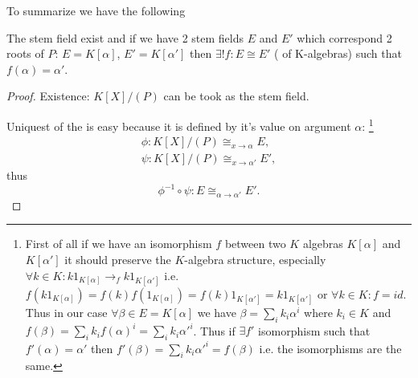 To summarize we have the following
\begin{proposition}
  The stem field exist and if we have 2 stem fields $E$ and $E'$ which
  correspond 2 roots of $P$: $E = K\left[\alpha\right]$,
  $E' = K\left[\alpha'\right]$ then $\exists! f: E \cong E'$
  ( of K-algebras) such that $f(\alpha) =
  \alpha'$. 
  \begin{proof}
    Existence: $K\left[X\right]/\left(P\right)$ can be took as the
    stem field.

    Uniquest of the  is easy because it is
    defined by it's value on argument $\alpha$:
    \footnote{
      \label{note:stemfieldisomorphismunique}
      First of all if we have an isomorphism $f$ between two $K$ algebras
      $K\left[\alpha \right]$ and $K\left[\alpha' \right]$ it should
      preserve the $K$-algebra structure, especially $\forall k \in K:
      k 1_{K\left[\alpha \right]} \to_f k 1_{K\left[\alpha' \right]}$
      i.e.
      \(
      f\left(k 1_{K\left[\alpha \right]}\right) = 
      f\left(k\right)
      f\left(1_{K\left[\alpha \right]}\right) =
      f\left(k\right)
      1_{K\left[\alpha'
          \right]} = 
      k 1_{K\left[\alpha'
          \right]}
      \) or
      \(\forall k \in K: f = id\).
      Thus in our case $\forall \beta \in E = K\left[\alpha\right]$ we have
      $\beta = \sum_i k_i \alpha^i$ where $k_i \in K$ and
      $f\left( \beta \right) = \sum_i k_i f \left( \alpha\right)^i =
      \sum_i k_i \alpha'^i$.
      Thus if $\exists f'$ isomorphism such that $f'\left(\alpha \right) =
      \alpha'$ then
      $f'\left( \beta \right) = \sum_i k_i \alpha'^i = f \left( \beta
      \right)$ i.e. the isomorphisms are the same.
    }
    \begin{eqnarray}
      \phi: K\left[X\right]/\left(P\right) \cong_{x \to \alpha} E,
      \nonumber \\
      \psi: K\left[X\right]/\left(P\right) \cong_{x \to \alpha'} E',
      \nonumber
    \end{eqnarray}
    thus
    \[
    \phi^{-1} \circ \psi: E \cong_{\alpha \to \alpha'} E'.
    \]
  \end{proof}
  \label{prop:stemfield}
\end{proposition}

